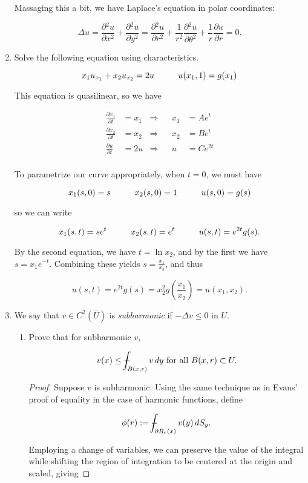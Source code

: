\documentclass[11pt,oneside,english]{amsart}
\theoremstyle{definition}
\newcommand{\pspace}{\hspace{10mm}}
\newcommand{\pp}[2]{\frac{\partial{#1}}{\partial{#2}}}
\def\Xint#1{\mathchoice
{\XXint\displaystyle\textstyle{#1}}%
{\XXint\textstyle\scriptstyle{#1}}%
{\XXint\scriptstyle\scriptscriptstyle{#1}}%
{\XXint\scriptscriptstyle\scriptscriptstyle{#1}}%
\!\int}
\def\XXint#1#2#3{{\setbox0=\hbox{$#1{#2#3}{\int}$ }
\vcenter{\hbox{$#2#3$ }}\kern-.6\wd0}}
\def\dashint{\Xint-}
\begin{document}
\begin{enumerate}
Massaging this a bit, we have Laplace's equation in polar coordinates:

\[
\Delta u=\pp{^2u}{x^2}+\pp{^2u}{y^2}=\pp{^2u}{r^2}+\frac{1}{r^2}\pp{^2u}{\theta^2}+\frac{1}{r}\pp{u}{r}=0.
\]


\item Solve the following equation using characteristics.

\[
x_1u_{x_1}+x_2u_{x_2}=2u\pspace u(x_1,1)=g(x_1)
\]

This equation is quasilinear, so we have

\begin{align*}
\pp{x_1}{t}&=x_1&\Longrightarrow& & x_1&=Ae^t\\[2mm]
\pp{x_2}{t}&=x_2&\Longrightarrow& & x_2&=Be^t\\[2mm]
\pp{u}{t}&=2u&\Longrightarrow& & u&=Ce^{2t}\\[2mm]
\end{align*}


To parametrize our curve appropriately, when $t=0$, we must have

\[
x_1(s,0)=s\pspace x_2(s,0)=1\pspace u(s,0)=g(s)
\]


so we can write

\[
x_1(s,t)=se^t\pspace x_2(s,t)=e^t\pspace u(s,t)=e^{2t}g(s).
\]

By the second equation, we have $t=\ln x_2$, and by the first we have $s=x_1e^{-t}$. Combining these yields $s=\frac{x_1}{x_2}$, and thus 

\[
u(s,t)=e^{2t}g(s)=x_2^2g\left(\frac{x_1}{x_2}\right)=u(x_1,x_2).
\]


\pagebreak

\item We say that $v\in C^2\left(\overline{U}\right)$ is \textit{subharmonic} if $-\Delta v\leq 0\text{ in }U$.

\begin{enumerate}
\item Prove that for subharmonic $v$, 

\[
v(x)\leq \dashint_{B(x,r)} v\,dy\text{ for all }B(x,r)\subset U. 
\]

\begin{proof}
Suppose $v$ is subharmonic. Using the same technique as in Evans' proof of equality in the case of harmonic functions, define

\[
\phi(r):=\dashint_{\partial B_r(x)}v(y)\,dS_y.
\]


Employing a change of variables, we can preserve the value of the integral while shifting the region of integration to be centered at the origin and scaled, giving


\end{proof}
\end{enumerate}
\end{enumerate}
\end{document}
